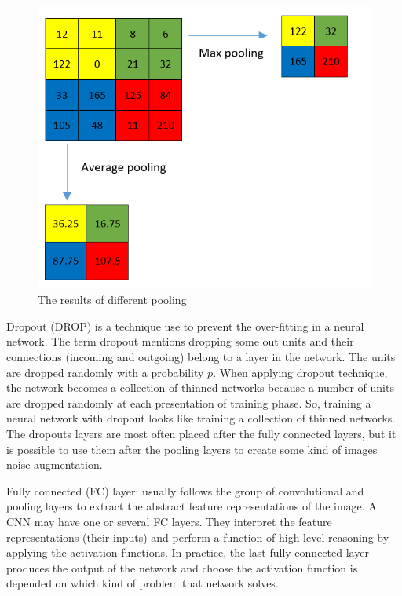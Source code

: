 \documentclass[review]{elsarticle}
\begin{document}
\begin{figure}[!h]
	\centering
	\includegraphics[scale=.5]{images/pooling}
	\caption{The results of different pooling}
	\label{imgcnn_pooling}
\end{figure}

Dropout (DROP) \cite{srivastava2014dropout} is a technique use to prevent the over-fitting in a neural network. The term dropout mentions dropping some out units and their connections (incoming and outgoing) belong to a layer in the network. The units are dropped randomly with a probability $p$. When applying dropout technique, the network becomes a collection of thinned networks \cite{srivastava2014dropout} because a number of units are dropped randomly at each presentation of training phase. So, training a neural network with dropout looks like training a collection of thinned networks. The dropouts layers are most often placed after the fully connected layers, but it is possible to use them after the pooling layers to create some kind of images noise augmentation.

Fully connected (FC) layer: usually follows the group of convolutional and pooling layers to extract the abstract feature representations of the image. A CNN may have one or several FC layers. They interpret the feature representations (their inputs) and perform a function of high-level reasoning by applying the activation functions. In practice, the last fully connected layer produces the output of the network and choose the activation function is depended on which kind of problem that network solves.
\end{document}
